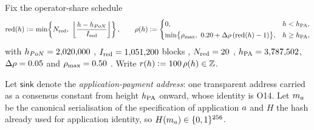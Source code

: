 \begin{definition}
\label{def:pnr:tx}
Fix the operator-share schedule
\[
  \mathrm{red}(h) \vcentcolon= \min\!\left\{N_{\mathrm{red}},\ \left\lfloor \frac{h - h_{PoN}}{I_{\mathrm{red}}} \right\rfloor\right\},
  \qquad
  \rho(h) \vcentcolon=
  \begin{cases}
    0, & h < h_{\mathrm{PA}},\\[2pt]
    \min\!\big\{\rho_{\max},\ 0.20 + \Delta\rho\,(\mathrm{red}(h) - 1)\big\}, & h \ge h_{\mathrm{PA}},
  \end{cases}
\]
with $h_{PoN} = 2{,}020{,}000$ ,
$I_{\mathrm{red}} = 1{,}051{,}200$ blocks ,
$N_{\mathrm{red}} = 20$ ,
$h_{\mathrm{PA}} = 3{,}787{,}502$, $\Delta\rho = 0.05$ and $\rho_{\max} = 0.50$
. Write $r(h) \vcentcolon= 100\,\rho(h) \in \mathbb{Z}$.

Let $\mathsf{sink}$ denote the \emph{application-payment address}: one transparent address carried
as a consensus constant from height $h_{\mathrm{PA}}$ onward, whose identity is O14. Let $m_{a}$ be the
canonical serialisation of the specification of application $a$ and $H$ the hash already used for
application identity, so $H(m_{a}) \in \{0,1\}^{256}$.


\end{definition}
